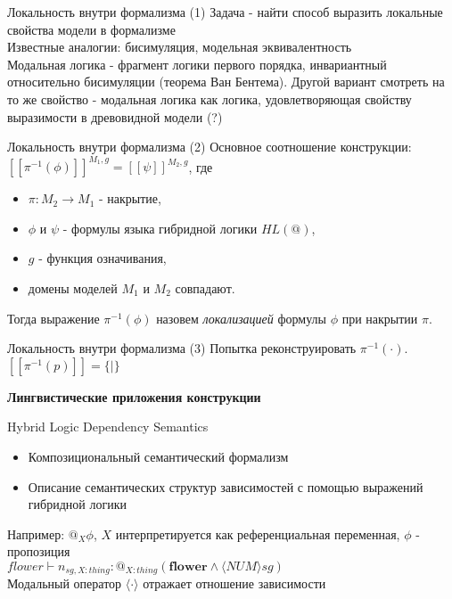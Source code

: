 \documentclass{beamer}
\begin{document}
\begin{frame}{Локальность внутри формализма (1)}
Задача - найти способ выразить локальные свойства модели в формализме\\
Известные аналогии: бисимуляция, модельная эквивалентность\\
Модальная логика - фрагмент логики первого порядка, инвариантный относительно бисимуляции (теорема Ван Бентема).
Другой вариант смотреть на то же свойство - модальная логика как логика, удовлетворяющая свойству выразимости в древовидной модели (?)
\end{frame}

\begin{frame}{Локальность внутри формализма (2)}
Основное соотношение конструкции:\\
\bigskip
$[ \! [ \pi^{-1}(\phi) ] \! ]^{M_1, g} = [ \! [ \psi ] \! ]^{M_2, g}$, где\\
\bigskip
\begin{itemize}
	\item $\pi : M_2 \to M_1$ - накрытие,
	\item $\phi$ и $\psi$ - формулы языка гибридной логики $HL(@)$,
	\item $g$ - функция означивания,
	\item домены моделей $M_1$ и $M_2$ совпадают.
\end{itemize}
\bigskip
Тогда выражение $\pi^{-1}(\phi)$ назовем \textit{локализацией} формулы $\phi$ при накрытии $\pi$.
\end{frame}

\begin{frame}{Локальность внутри формализма (3)}
Попытка реконструировать $\pi^{-1}( \cdot )$.\\
$[ \! [ \pi^{-1}(p) ] \! ] = \{   \vert \}$
\end{frame}


\begin{frame}{}
\begin{center}
	\textbf{Лингвистические приложения конструкции}
\end{center}
\end{frame}

\begin{frame}{Hybrid Logic Dependency Semantics}
\begin{itemize}
	\item Композициональный семантический формализм 
	\item Описание семантических структур зависимостей с помощью выражений гибридной логики
\end{itemize}
\bigskip
Например: $@_X\phi$, $X$ интерпретируется как референциальная переменная, $\phi$ - пропозиция\\
$flower \vdash n_{sg,X:thing} : @_{X:thing}(\textbf{flower} \wedge \langle NUM \rangle sg)$\\
Модальный оператор $\langle \cdot \rangle$ отражает отношение зависимости
\end{frame}
\end{document}
